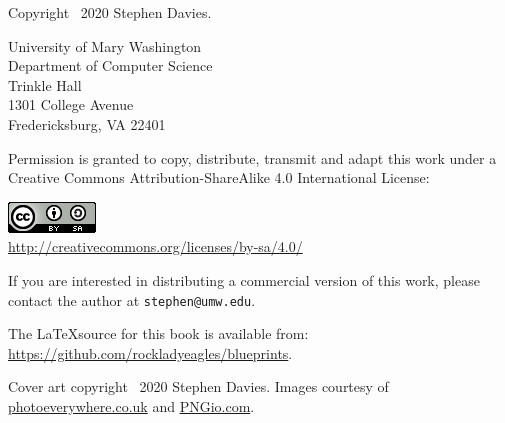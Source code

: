 
\thispagestyle{empty}

Copyright \textcopyright \ 2020 Stephen Davies.

\bigskip

University of Mary Washington\\
Department of Computer Science\\
Trinkle Hall\\
1301 College Avenue\\
Fredericksburg, VA  22401

\vspace{.4in}

Permission is granted to copy, distribute, transmit and adapt this work under a
Creative Commons Attribution-ShareAlike 4.0 International License:

\begin{center}
\includegraphics{cc_license.png}\\
\smallskip
\url{http://creativecommons.org/licenses/by-sa/4.0/}
\end{center}

\vspace{.2in}
If you are interested in distributing a commercial version of this work, please
contact the author at \texttt{stephen@umw.edu}.

\vspace{.4in}
The \LaTeX source for this book is available from:
\url{https://github.com/rockladyeagles/blueprints}.

\vspace{1.8in}
Cover art copyright \textcopyright \ 2020 Stephen Davies.
Images courtesy of \url{photoeverywhere.co.uk} and \url{PNGio.com}.
